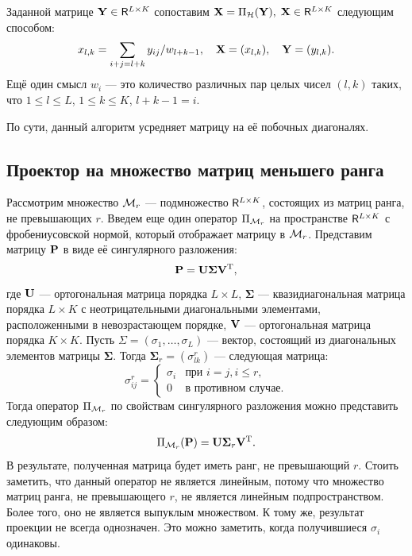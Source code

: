 \documentclass[12pt,a4paper,fleqn,leqno]{article}
\begin{document}
Заданной матрице $\mathbf{Y} \in \mathsf{R}^{L \times K}$ сопоставим $\mathbf{X} = \Pi_{\mathcal{H}}(\mathbf{Y}),$ $\mathbf{X} \in \mathsf{R}^{L \times K}$ следующим способом:
\begin{equation*}
x_{l,k} = \sum_{i + j = l + k} y_{i j} / w_{l + k - 1}, \quad \mathbf{X} = (x_{l,k}), \quad \mathbf{Y} = (y_{l,k}).
\end{equation*}
Ещё один смысл $w_i$ --- это количество различных пар целых чисел $(l, k)$ таких, что $1 \le l \le L$, $1 \le k \le K$, $l + k - 1 = i$.

По сути, данный алгоритм усредняет матрицу на её побочных диагоналях.

\subsection{Проектор на множество матриц меньшего ранга}\label{frob_r_rank} \label{rank_proj}
Рассмотрим множество $\mathcal{M}_r$ --- подмножество $\mathsf{R}^{L \times K}$, состоящих из матриц ранга, не превышающих $r$. Введем еще один оператор $\Pi_{\mathcal{M}_r}$ на пространстве $\mathsf{R}^{L \times K}$ с фробениусовской нормой, который отображает матрицу в $\mathcal{M}_r$. Представим матрицу $\mathbf{P}$ в виде её сингулярного разложения:
$$\mathbf{P} =  \mathbf{U} \mathbf{\Sigma} \mathbf{V}^{\mathrm{T}},$$ где $\mathbf{U}$ --- ортогональная матрица порядка $L \times L$, $\mathbf{\Sigma}$ --- квазидиагональная матрица порядка $L \times K$ с неотрицательными диагональными элементами, расположенными в невозрастающем порядке, $\mathbf{V}$ --- ортогональная матрица порядка $K \times K$. Пусть $\Sigma = (\sigma_1, \ldots, \sigma_L)$ --- вектор, состоящий из диагональных элементов матрицы $\mathbf{\Sigma}$. Тогда $\mathbf{\Sigma}_r = (\sigma^r_{l k})$ --- следующая матрица:
\begin{equation*}
\sigma^r_{i j} = \begin{cases}
\sigma_i & \text{при $i = j, i \le r,$}\\
0 & \text{в противном случае}.
\end{cases}
\end{equation*}
Тогда оператор $\Pi_{\mathcal{M}_r}$ по свойствам сингулярного разложения можно представить следующим образом: $$\Pi_{\mathcal{M}_r}(\mathbf{P}) = \mathbf{U} \mathbf{\Sigma}_r \mathbf{V}^{\mathrm{T}}.$$ В результате, полученная матрица будет иметь ранг, не превышающий $r$. Стоить заметить, что данный оператор не является линейным, потому что множество матриц ранга, не превышающего $r$, не является линейным подпространством. Более того, оно не является выпуклым множеством. К тому же, результат проекции не всегда однозначен. Это можно заметить, когда получившиеся $\sigma_{i}$ одинаковы.
\end{document}
